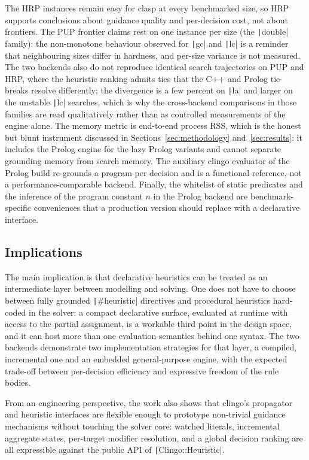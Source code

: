 The HRP instances remain easy for clasp at every benchmarked size, so HRP supports conclusions about guidance quality and per-decision cost, not about frontiers. The PUP frontier claims rest on one instance per size (the \texttt|double| family): the non-monotone behaviour observed for \texttt|gc| and \texttt|lc| is a reminder that neighbouring sizes differ in hardness, and per-size variance is not measured. The two backends also do not reproduce identical search trajectories on PUP and HRP, where the heuristic ranking admits ties that the C++ and Prolog tie-breaks resolve differently; the divergence is a few percent on \texttt|la| and larger on the unstable \texttt|lc| searches, which is why the cross-backend comparisons in those families are read qualitatively rather than as controlled measurements of the engine alone. The memory metric is end-to-end process RSS, which is the honest but blunt instrument discussed in Sections~\ref{sec:methodology} and~\ref{sec:results}: it includes the Prolog engine for the lazy Prolog variants and cannot separate grounding memory from search memory. The auxiliary clingo evaluator of the Prolog build re-grounds a program per decision and is a functional reference, not a performance-comparable backend. Finally, the whitelist of static predicates and the inference of the program constant $n$ in the Prolog backend are benchmark-specific conveniences that a production version should replace with a declarative interface.

\subsection{Implications}

The main implication is that declarative heuristics can be treated as an intermediate layer between modelling and solving. One does not have to choose between fully grounded \texttt|#heuristic| directives and procedural heuristics hard-coded in the solver: a compact declarative surface, evaluated at runtime with access to the partial assignment, is a workable third point in the design space, and it can host more than one evaluation semantics behind one syntax. The two backends demonstrate two implementation strategies for that layer, a compiled, incremental one and an embedded general-purpose engine, with the expected trade-off between per-decision efficiency and expressive freedom of the rule bodies.

From an engineering perspective, the work also shows that clingo's propagator and heuristic interfaces are flexible enough to prototype non-trivial guidance mechanisms without touching the solver core: watched literals, incremental aggregate states, per-target modifier resolution, and a global decision ranking are all expressible against the public API of \texttt|Clingo::Heuristic|.

